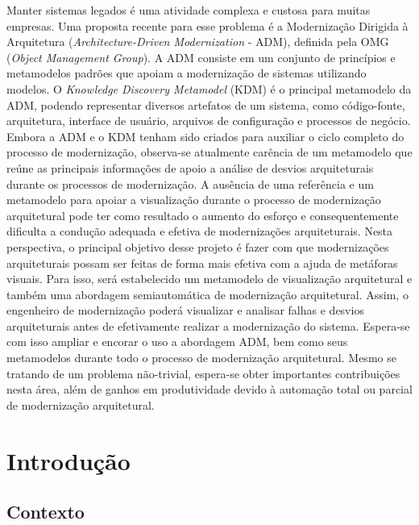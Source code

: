 \documentclass[12pt]{article}
\begin{document}
 

\setlength{\voffset}{0cm}
\setlength{\hoffset}{0cm}



\begin{resumo}
Manter sistemas legados é uma atividade complexa e custosa para muitas empresas. Uma proposta recente para esse problema é a Modernização Dirigida à Arquitetura (\textit{Architecture-Driven Modernization} - ADM), definida pela OMG (\textit{Object Management Group}). A ADM consiste em um conjunto de princípios e metamodelos padrões que apoiam a modernização de sistemas utilizando modelos. O \textit{Knowledge Discovery Metamodel} (KDM) é o principal metamodelo da ADM, podendo representar diversos artefatos de um sistema, como código-fonte, arquitetura, interface de usuário, arquivos de configuração e processos de negócio. Embora a ADM e o KDM tenham sido criados para auxiliar o ciclo completo do processo de modernização, observa-se atualmente carência de um metamodelo que reúne as principais informações de apoio a análise de desvios arquiteturais durante os processos de modernização. A ausência de uma referência e um metamodelo para apoiar a visualização durante o processo de modernização arquitetural pode ter como resultado o aumento do esforço e consequentemente dificulta a condução adequada e efetiva de modernizações arquiteturais. Nesta perspectiva, o principal objetivo desse projeto é fazer com que modernizações arquiteturais possam ser feitas de forma mais efetiva com a ajuda de metáforas visuais. Para isso, será estabelecido um metamodelo de visualização arquitetural e também uma abordagem semiautomática  de modernização arquitetural. Assim, o engenheiro de modernização poderá visualizar e analisar falhas e desvios arquiteturais antes de efetivamente realizar a modernização do sistema. Espera-se com isso ampliar e encorar o uso a abordagem ADM, bem como seus metamodelos durante todo o processo de modernização arquitetural. Mesmo se tratando de um problema não-trivial, espera-se obter importantes contribuições nesta área, além de ganhos em produtividade devido à automação total ou parcial de modernização arquitetural.
\end{resumo}

\section{Introdução}

\subsection{Contexto}
\end{document}
